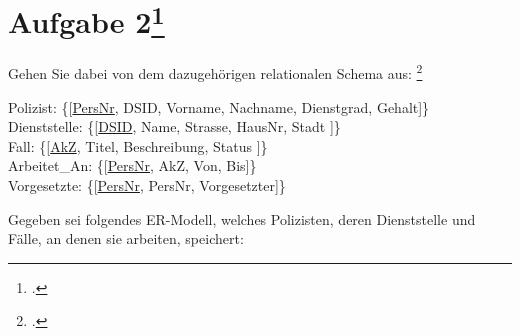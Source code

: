 \documentclass{lehramt-informatik-minimal}
\begin{document}
\section{Aufgabe 2\footcite{db:pu:3}}

\noindent
Gehen Sie dabei von dem dazugehörigen relationalen Schema aus:
\footcite[DB/ST - Frühjahr 2016, 66116, Thema 1 Teilaufgabe 1 A 2]{examen:66116:2016:03}
\bigskip

{
\noindent
\ttfamily
\footnotesize
Polizist: \{[\underline{PersNr}, DSID, Vorname, Nachname, Dienstgrad, Gehalt]\}\\
Dienststelle: \{[\underline{DSID}, Name, Strasse, HausNr, Stadt ]\}\\
Fall: \{[\underline{AkZ}, Titel, Beschreibung, Status ]\}\\
Arbeitet\_An: \{[\underline{PersNr}, AkZ, Von, Bis]\}\\
Vorgesetzte: \{[\underline{PersNr}, PersNr, Vorgesetzter]\}
}

\bigskip

\noindent
Gegeben sei folgendes ER-Modell, welches Polizisten, deren Dienststelle
und Fälle, an denen sie arbeiten, speichert:
\end{document}
